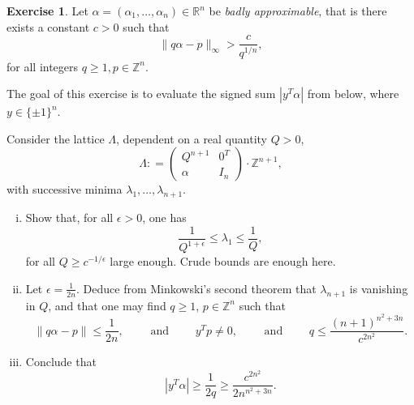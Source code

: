\documentclass[12pt,a4paper]{article}
\theoremstyle{plain}
\newtheorem*{Sol*}{Solution}
\theoremstyle{definition}
\newtheorem{Ex}{Exercise}
\def \R {\mathbb R}
\def \Z {\mathbb Z}
\newcommand{\df}{\mathrel{\mathop:}=}
\newif\ifsolutions
\newcommand{\exercise}[2]{
			\begin{Ex} #1 \end{Ex}
			\ifsolutions  \begin{Sol*} #2 \end{Sol*} \bigskip \else \bigskip  \fi
		}
\begin{document}
\exercise{
	Let $\alpha = (\alpha_1, \dots, \alpha_n) \in \R^n$ be \emph{badly approximable}, that is there exists a constant $c > 0$ such that
		\[ \| q \alpha - p \|_\infty > \frac{c}{q^{1/n}}, \]
	for all integers $q \geq 1, p \in \Z^n$.

	The goal of this exercise is to evaluate the signed sum $| y^T \alpha |$ from below, where $y \in \{ \pm 1 \}^n$.

	Consider the lattice $\Lambda$, dependent on a real quantity $Q > 0$,
		\[ \Lambda \df \begin{pmatrix} Q^{n+1} & 0^T \\
								\alpha & I_n \end{pmatrix} \cdot \Z^{n+1}, \]
	with successive minima $\lambda_1, \dots, \lambda_{n+1}$.
	
	\begin{enumerate}[i)]
		\item 
		Show that, for all $\epsilon > 0$, one has
			\[ \frac{1}{Q^{1 + \epsilon}} \leq \lambda_1 \leq \frac{1}{Q}, \]
		for all $Q \geq c^{-1/\epsilon}$ large enough. Crude bounds are enough here.
		
		\item 
		Let $\epsilon = \frac1{2n}$. Deduce from Minkowski's second theorem that $\lambda_{n+1}$ is vanishing in $Q$, and that one may find $q \geq 1$, $p \in \Z^n$ such that
			\[ \| q \alpha - p \| \leq \frac{1}{2n}, \qquad \text{ and } \qquad y^T p \neq 0, \qquad \text{ and } \qquad q \leq \frac{(n+1)^{n^2 + 3n}}{c^{2n^2}}. \]
		
		\item
		Conclude that 
			\[ | y^T \alpha | \geq \frac{1}{2q} \geq \frac{c^{2n^2}}{2n^{n^2 + 3n}} . \]
	\end{enumerate}

}
{}
\end{document}
